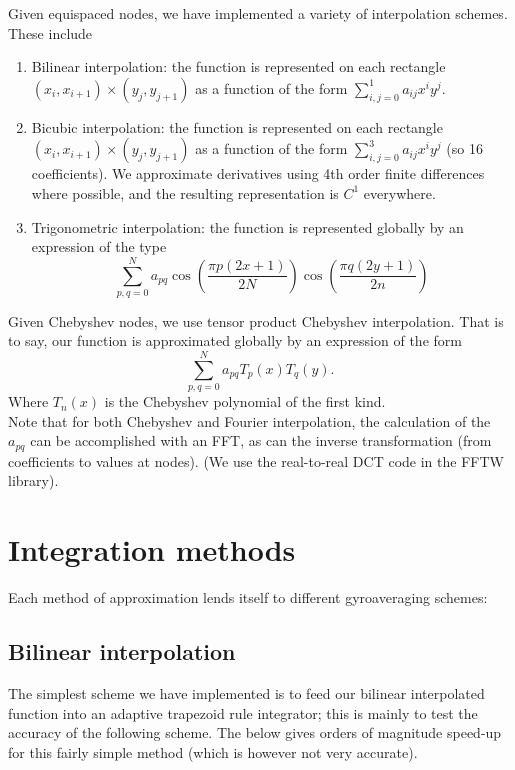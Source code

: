 \documentclass{article}
\theoremstyle{theorem}
\theoremstyle{definition}
\begin{document}
Given equispaced nodes, we have implemented a variety of interpolation schemes.  These include
\begin{enumerate}
	\item Bilinear interpolation:  the function is represented on each rectangle $(x_i,x_{i+1}) \times (y_j,y_{j+1})$  as a function of the form $\sum_{i,j=0}^{1} a_{ij} x^i y^j$.
	\item Bicubic interpolation:    the function is represented on each rectangle $(x_i,x_{i+1}) \times (y_j,y_{j+1})$  as a function of the form $\sum_{i,j=0}^{3} a_{ij} x^i y^j$ (so 16 coefficients).  We approximate derivatives using 4th order finite differences where possible, and the resulting representation is $C^1$ everywhere.  
	\item Trigonometric interpolation:  the function is represented globally by an expression of the type \[\sum_{p,q=0}^N a_{pq} \cos\left(\frac{\pi p (2x+1)}{2N}\right) \cos\left(\frac{\pi q (2y+1)}{2n}\right)\]
\end{enumerate}

Given Chebyshev nodes, we use tensor product Chebyshev interpolation.  That is to say, our function is approximated globally by an expression of the form
\[\sum_{p,q=0}^N a_{pq} T_p(x) T_q(y). \]
Where $T_n(x)$ is the Chebyshev polynomial of the first kind.  \\
Note that for both Chebyshev and Fourier interpolation, the calculation of the $a_{pq}$ can be accomplished with an FFT, as can the inverse transformation (from coefficients to values at nodes).  (We use the real-to-real DCT code in the FFTW library).  

\section{Integration methods}
Each method of approximation lends itself to different gyroaveraging schemes: 

\subsection{Bilinear interpolation}
The simplest scheme we have implemented is to feed our bilinear interpolated function into an adaptive trapezoid rule integrator; this is mainly to test the accuracy of the following scheme.  The below gives orders of magnitude speed-up for this fairly simple method (which is however not very accurate).
\end{document}
